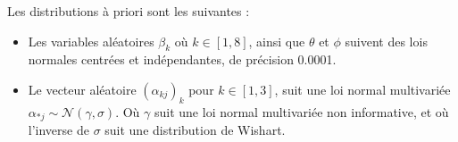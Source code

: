 \documentclass[11pt]{article}
\begin{document}
    Les distributions à priori sont les suivantes : 
    \begin{itemize}
        \item Les variables aléatoires $\beta_k$ où $k \in [1,8]$, ainsi que $\theta$ et $\phi$ suivent des lois normales centrées et indépendantes, de précision 0.0001.
        \item Le vecteur aléatoire $(\alpha_{kj})_k$ pour $k \in [1,3]$, suit une loi normal multivariée $\alpha_{*j} \sim \mathcal{N}( \gamma, \sigma)$. Où $\gamma$ suit une loi normal multivariée non informative, et où l'inverse de  $\sigma$ suit une distribution de Wishart.
    \end{itemize}
    
    

    
\end{document}
